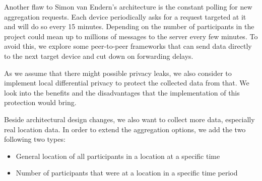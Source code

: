 Another flaw to Simon van Endern's architecture is the constant polling for new aggregation requests. Each device periodically asks for a request targeted at it and will do so every 15 minutes. Depending on the number of participants in the project could mean up to millions of messages to the server every few minutes. To avoid this, we explore some peer-to-peer frameworks that can send data directly to the next target device and cut down on forwarding delays.

As we assume that there might possible privacy leaks, we also consider to implement local differential privacy to protect the collected data from that. We look into the benefits and the disadvantages that the implementation of this protection would bring.

Beside architectural design changes, we also want to collect more data, especially real location data. In order to extend the aggregation options, we add the two following two types:
\begin{itemize}
    \item General location of all participants in a location at a specific time
    \item Number of participants that were at a location in a specific time period
\end{itemize}

